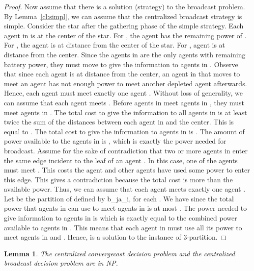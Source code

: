 \documentclass{article}
\newtheorem{lemma}{Lemma}
\newcommand\strat{\mbox{strategy}\xspace}
\newcommand\cccast{centralized convergecast\xspace}
\begin{document}
\begin{proof}
Now assume that there is a solution (strategy) to the broadcast problem.
By Lemma~\ref{cl:simpl}, we can assume that the centralized broadcast {\strat} is simple. Consider the star  after the gathering phase of the simple {\strat}. Each agent in  is at the center of the star. For , the agent  has the remaining power of . For , the agent  is at distance  from the center of the star. For , agent  is at distance  from the center. Since the agents in  are the only agents with remaining battery power, they must move to give the information to agents in . Observe that since each agent  is at distance  from the center, an agent in  that moves to meet an agent  has not enough power to meet another depleted 
agent afterwards. Hence, each agent  must meet exactly one agent . Without loss of generality, we can assume that each agent  meets . Before agents in  meet agents in , they must meet agents in . The total cost to give the information to all agents in  is at least twice the sum of the distances between each agent in  and the center. This is equal to . The total cost to give the information to agents in  is 
. The amount of power available to the agents in  is , which is exactly the power needed for broadcast.
Assume for the sake of contradiction that two or more agents in  enter the same edge incident to the leaf of an agent . In this case, one of the agents must meet . This costs the agent  and other agents have used some power to enter this edge. This gives a contradiction because the total cost is more than the available power. Thus, we can assume that each agent  meets exactly one agent . Let  be the partition of  defined by b_ja_i, for each . We have  since the total power that agents  in  can use to meet agents in  is at most . The power needed to give information to agents in  is  which is exactly equal to the combined power available to agents in . This means that each agent in  must use all its power to meet agents in  and . Hence,  is a solution to the instance of 3-partition.
\end{proof}

\begin{lemma}\label{lem:NP-graph}
The {\cccast} decision problem and the centralized broadcast decision problem are in NP.  
\end{lemma}
\end{document}
